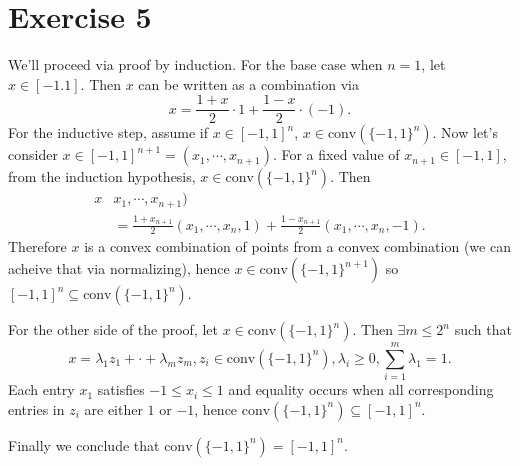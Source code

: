 \documentclass{article}
\begin{document}
\newpage
\section*{Exercise 5}
We'll proceed via proof by induction. For the base case when $n = 1$, let $x \in [-1. 1]$. Then $x$ can be written 
as a combination via 
\[ x = \frac{1 + x}{2} \cdot 1 + \frac{1 - x}{2} \cdot (-1). \]
For the inductive step, assume if $x \in [-1, 1]^n$, $x \in \text{conv}(\{ -1, 1 \}^n)$. Now let's consider 
$x \in [-1, 1]^{n + 1} = (x_1, \cdots, x_{n + 1})$. For a fixed value of $x_{n + 1} \in [-1, 1]$, from the 
induction hypothesis, $x \in \text{conv}(\{ -1, 1 \}^n)$. Then 
\begin{align*}
	x 
	&x_1, \cdots, x_{n + 1}) \\
	&= \frac{1 + x_{n + 1}}{2}(x_1, \cdots, x_n, 1) + \frac{1 - x_{n + 1}}{2}(x_1, \cdots, x_n, -1).
\end{align*}
Therefore $x$ is a convex combination of points from a convex combination (we can acheive that via normalizing), hence 
$x \in \text{conv}(\{ -1, 1 \}^{n + 1})$ so $[-1,1]^n \subseteq \text{conv}(\{-1, 1\}^n)$.

For the other side of the proof, let $x \in \text{conv}(\{ -1, 1 \}^n)$. Then $\exists m \leq 2^n$ such that 
\[ x = \lambda_1 z_1 + \cdot + \lambda_m z_m, z_i \in \text{conv}(\{ -1, 1 \}^n), \lambda_i \geq 0, 
\sum_{i = 1}^{m} \lambda_1 = 1. \]
Each entry $x_1$ satisfies $-1 \leq x_i \leq 1$ and equality occurs when all corresponding entries in $z_i$ are 
either $1$ or $-1$, hence $\text{conv}(\{-1, 1\}^n) \subseteq [-1, 1]^n$.

Finally we conclude that $\text{conv}(\{-1, 1\}^n) = [-1, 1]^n$.


\newpage
\end{document}
